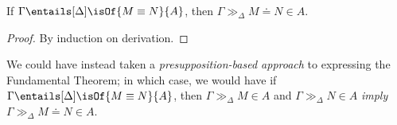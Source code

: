 \documentclass{article}
\newcommand{\exeq}[5]{#1 \gg_#2 #3 \doteq #4 \in #5}
\newcommand{\exref}[4]{#1 \gg_#2 #3\in #4}
\newcommand{\judgeq}[5]{#1 \entails[#2] \isOf{#3 \equiv #4}{#5}}
\begin{document}
\begin{theorem}
    If $\judgeq{\Gamma}{\Delta}{M}{N}{A}$, then $\exeq{\Gamma}{\Delta}{M}{N}{A}$.
\end{theorem}
\begin{proof}
    By induction on derivation.
\end{proof}

We could have instead taken a \emph{presupposition-based approach} to expressing the Fundamental Theorem; in which case, we would have if $\judgeq{\Gamma}{\Delta}{M}{N}{A}$, then $\exref{\Gamma}{\Delta}{M}{A}$ and $\exref{\Gamma}{\Delta}{N}{A}$ \emph{imply} $\exeq{\Gamma}{\Delta}{M}{N}{A}$.
\end{document}
